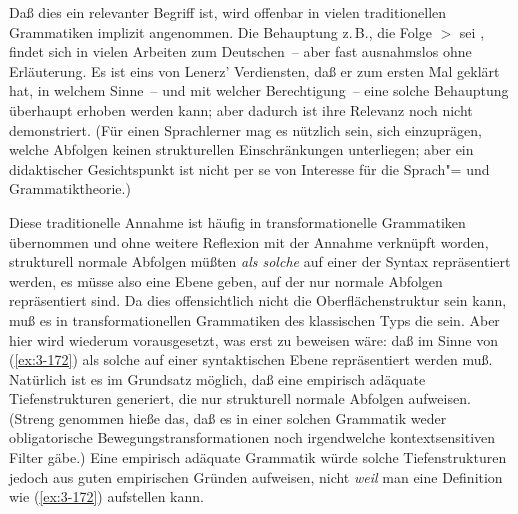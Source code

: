 \documentclass[output=paper]{langsci/langscibook}
\begin{document}
Daß dies ein relevanter Begriff ist, wird offenbar in vielen
traditionellen Grammatiken implizit angenommen. Die Behauptung z.\,B.,
die Folge  $>$  sei , findet
sich in vielen Arbeiten zum Deutschen~-- aber fast ausnahmslos ohne
Erläuterung. Es ist eins von Lenerz' Verdiensten, daß er zum ersten
Mal geklärt hat, in welchem Sinne~-- und mit welcher Berechtigung~--
eine solche Behauptung überhaupt erhoben werden kann; aber dadurch
ist ihre Relevanz noch nicht demonstriert. (Für einen Sprachlerner mag
es nützlich sein, sich einzuprägen, welche Abfolgen keinen
strukturellen Einschränkungen unterliegen; aber ein didaktischer
Gesichtspunkt ist nicht per se von Interesse für die Sprach"= und
Grammatiktheorie.)

Diese traditionelle Annahme ist häufig in transformationelle
Grammatiken übernommen und ohne weitere Reflexion mit der Annahme
verknüpft worden, strukturell normale Abfolgen müßten \textit{als solche} auf
einer  der Syntax repräsentiert werden, es müsse also
eine Ebene geben, auf der nur normale Abfolgen repräsentiert sind. Da
dies offensichtlich nicht die Oberflächenstruktur sein kann, muß es in
transformationellen Grammatiken des klassischen Typs die
 sein. Aber hier wird wiederum vorausgesetzt, was erst
zu beweisen wäre: daß  im Sinne von (\ref{ex:3-172}) als
solche auf einer syntaktischen Ebene repräsentiert werden muß. Natürlich ist es im Grundsatz möglich, daß eine empirisch adäquate  Tiefenstrukturen generiert, die
nur strukturell normale Abfolgen aufweisen. (Streng genommen hieße
das, daß es in einer solchen Grammatik weder obligatorische Bewegungstransformationen noch irgendwelche kontextsensitiven Filter gäbe.) Eine empirisch adäquate Grammatik würde solche Tiefenstrukturen jedoch aus guten empirischen Gründen aufweisen, nicht \textit{weil} man eine
Definition wie (\ref{ex:3-172}) aufstellen kann.
\end{document}
